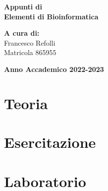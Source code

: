 \documentclass[a4paper,12pt,oneside]{book}
\begin{document}
    
    \begin{titlepage}
        
	\vspace{40mm}
        
	\begin{center}
            {\LARGE{
                    \textbf{Appunti di \\ Elementi di Bioinformatica}
                    \par
            }}
        \end{center}
        
        \vspace{50mm}

        \begin{flushright}
            {\large \textbf{A cura di:}} \\
            \large{Francesco Refolli} \\
            \large{Matricola 865955} 
        \end{flushright}
        
        \vspace{40mm}
        \begin{center}
            {\large{\bf Anno Accademico 2022-2023}}
        \end{center}

        \restoregeometry
        
    \end{titlepage}
    
    \printindex
    
    \part{Teoria}
    
    
    
    \part{Esercitazione}
    \part{Laboratorio}
\end{document}
